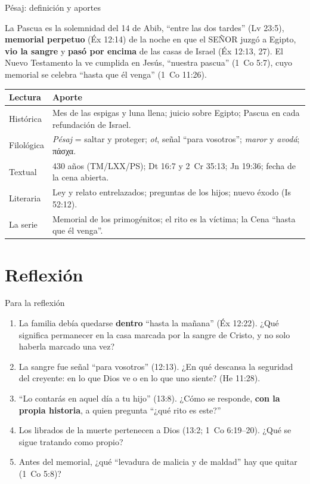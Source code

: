 \documentclass[hyperref={bookmarks=false},aspectratio=169]{beamer}
\newcommand{\grc}[1]{\foreignlanguage{ancientgreek}{#1}}
\newcommand{\SENOR}{S{\fontsize{0.78em}{1em}\selectfont EÑOR}}
\newcommand{\destacar}[1]{\textbf{\textcolor{tierraroja}{#1}}}
\begin{document}
\begin{frame}{Pésaj: definición y aportes}
\begin{tcolorbox}[colback=papiro,colframe=tierraroja,boxrule=1pt,arc=3pt,fontupper=\scriptsize]
La Pascua es la solemnidad del 14 de Abib, ``entre las dos tardes'' (Lv 23:5), \destacar{memorial perpetuo} (Éx 12:14) de la noche en que el \SENOR{} juzgó a Egipto, \destacar{vio la sangre} y \destacar{pasó por encima} de las casas de Israel (Éx 12:13, 27). El Nuevo Testamento la ve cumplida en Jesús, ``nuestra pascua'' (1~Co 5:7), cuyo memorial se celebra ``hasta que él venga'' (1~Co 11:26).
\end{tcolorbox}
\scriptsize\renewcommand{\arraystretch}{1.08}
\begin{tabular}{@{}L{2.0cm}L{10.1cm}@{}}
\toprule
\textbf{Lectura} & \textbf{Aporte} \\ \midrule
Histórica & Mes de las espigas y luna llena; juicio sobre Egipto; Pascua en cada refundación de Israel. \\
Filológica & \emph{Pésaj} = saltar y proteger; \emph{ot}, señal ``para vosotros''; \emph{maror} y \emph{avodá}; \grc{πάσχα}. \\
Textual & 430 años (TM/LXX/PS); Dt 16:7 y 2~Cr 35:13; Jn 19:36; fecha de la cena abierta. \\
Literaria & Ley y relato entrelazados; preguntas de los hijos; nuevo éxodo (Is 52:12). \\
La serie & Memorial de los primogénitos; el rito es la víctima; la Cena ``hasta que él venga''. \\
\bottomrule
\end{tabular}
\end{frame}

\section{Reflexión}

\begin{frame}{Para la reflexión}
\small
\begin{enumerate}
\item La familia debía quedarse \destacar{dentro} ``hasta la mañana'' (Éx 12:22). ¿Qué significa permanecer en la casa marcada por la sangre de Cristo, y no solo haberla marcado una vez?
\item La sangre fue señal ``para vosotros'' (12:13). ¿En qué descansa la seguridad del creyente: en lo que Dios ve o en lo que uno siente? (He 11:28).
\item ``Lo contarás en aquel día a tu hijo'' (13:8). ¿Cómo se responde, \destacar{con la propia historia}, a quien pregunta ``¿qué rito es este?''
\item Los librados de la muerte pertenecen a Dios (13:2; 1~Co 6:19--20). ¿Qué se sigue tratando como propio?
\item Antes del memorial, ¿qué ``levadura de malicia y de maldad'' hay que quitar (1~Co 5:8)?
\end{enumerate}
\end{frame}
\end{document}
